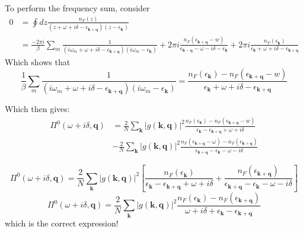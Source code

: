 \documentclass[]{article}
\newcommand{\kk}{\mathbf{k}}
\newcommand{\qq}{\mathbf{q}}
\newcommand{\iwm}{i\omega_m}
\newcommand{\gs}{\left| g(\mathbf{k}, \mathbf{q}) \right|^2}
\begin{document}
To perform the frequency sum, consider
\begin{equation}
\begin{split}
0 &= \oint dz \frac{n_F(z)}{(z + \omega + i\delta - \epsilon_{\kk+\qq})(z-\epsilon_\kk)} \\
& =  \frac{-2\pi i}{\beta}\sum_m \frac{1}{(\iwm + \omega + i\delta - \epsilon_{\kk+\qq})(\iwm-\epsilon_\kk)} + 2\pi i \frac{n_F(\epsilon_{\kk+\qq}-w)}{\epsilon_{\kk-\qq}-\omega-i\delta-\epsilon_\kk} + 2\pi i \frac{n_F(\epsilon_\kk)}{\epsilon_\kk+\omega+i\delta-\epsilon_{\kk+\qq}}
\end{split}
\end{equation}
Which shows that
\begin{equation}
\frac{1}{\beta}\sum_m \frac{1}{(\iwm + \omega + i\delta - \epsilon_{\kk+\qq})(\iwm-\epsilon_\kk)} =  \frac{n_F(\epsilon_\kk) - n_F(\epsilon_{\kk+\qq}-w) }{\epsilon_\kk+\omega+i\delta-\epsilon_{\kk+\qq}}
\end{equation}

Which then gives:
\begin{equation}
\begin{split}
\Pi^0(\omega+i\delta, \qq) & = \frac{2}{N} \sum_\kk \gs \frac{n_F(\epsilon_\kk) - n_F(\epsilon_{\kk+\qq}-w) }{\epsilon_\kk-\epsilon_{\kk+\qq}+\omega+i\delta} \\
& - \frac{2}{N} \sum_\kk \gs \frac{n_F(\epsilon_{\kk+\qq}-\omega) - n_F(\epsilon_{\kk+\qq})}{\epsilon_{\kk+\qq}-\epsilon_\kk-\omega-i\delta}
\end{split}
\end{equation}

\begin{equation}
\Pi^0(\omega+i\delta, \qq) = \frac{2}{N} \sum_\kk \gs \left[ \frac{n_F(\epsilon_\kk)}{\epsilon_\kk-\epsilon_{\kk+\qq}+\omega+i\delta} + \frac{n_F(\epsilon_{\kk+\qq})}{\epsilon_{\kk+\qq}-\epsilon_\kk-\omega-i\delta} \right]
\end{equation}
\begin{equation}
\Pi^0(\omega+i\delta, \qq) = \frac{2}{N} \sum_\kk \gs \frac{n_F(\epsilon_\kk) - n_F(\epsilon_{\kk+\qq}) }{\omega+i\delta+\epsilon_\kk-\epsilon_{\kk+\qq}}
\end{equation}
which is the correct expression!
\end{document}
